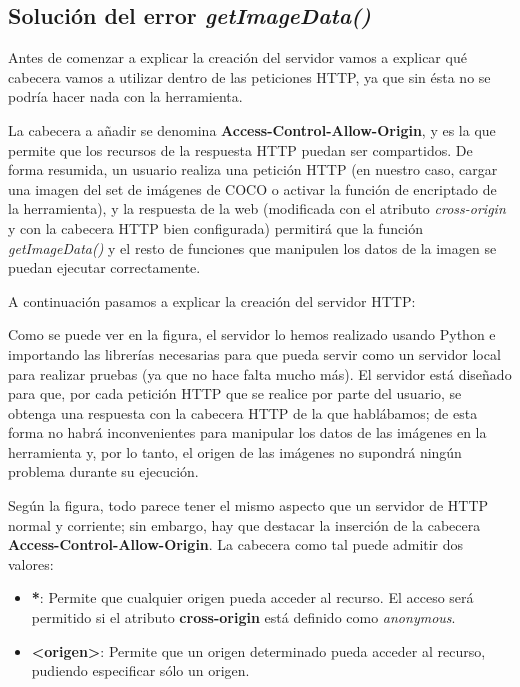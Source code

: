 \subsection{Solución del error \textit{getImageData()}}

Antes de comenzar a explicar la creación del servidor vamos a explicar qué cabecera vamos a utilizar dentro de las peticiones HTTP, ya que sin ésta no se podría hacer nada con la herramienta.

La cabecera a añadir se denomina \textbf{Access-Control-Allow-Origin}, y es la que permite que los recursos de la respuesta HTTP puedan ser compartidos. De forma resumida, un usuario realiza una petición HTTP (en nuestro caso, cargar una imagen del set de imágenes de COCO o activar la función de encriptado de la herramienta), y la respuesta de la web (modificada con el atributo \textit{cross-origin} y con la cabecera HTTP bien configurada) permitirá que la función \textit{getImageData()} y el resto de funciones que manipulen los datos de la imagen se puedan ejecutar correctamente.

A continuación pasamos a explicar la creación del servidor HTTP:


Como se puede ver en la figura, el servidor lo hemos realizado usando Python e importando las librerías necesarias para que pueda servir como un servidor local para realizar pruebas (ya que no hace falta mucho más). El servidor está diseñado para que, por cada petición HTTP que se realice por parte del usuario, se obtenga una respuesta con la cabecera HTTP de la que hablábamos; de esta forma no habrá inconvenientes para manipular los datos de las imágenes en la herramienta y, por lo tanto, el origen de las imágenes no supondrá ningún problema durante su ejecución.

Según la figura, todo parece tener el mismo aspecto que un servidor de HTTP normal y corriente; sin embargo, hay que destacar la inserción de la cabecera \textbf{Access-Control-Allow-Origin}. La cabecera como tal puede admitir dos valores: %

\begin{itemize}
\item \textbf{*}: Permite que cualquier origen pueda acceder al recurso. El acceso será permitido si el atributo \textbf{cross-origin} está definido como \textit{anonymous}.
\item \textbf{<origen>}: Permite que un origen determinado pueda acceder al recurso, pudiendo especificar sólo un origen.
\end{itemize}

